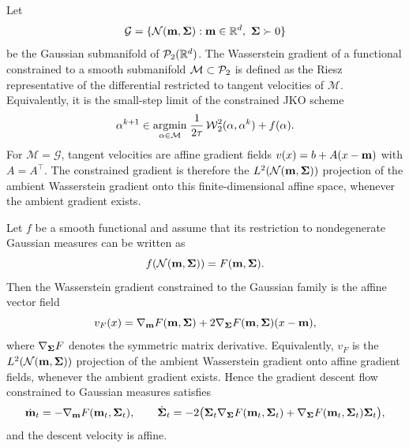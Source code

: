 Let
\[
	\mathcal G=\{\mathcal{N}(\mathbf{m},\mathbf{\Sigma}):\mathbf{m}\in\mathbb{R}^d,\ \mathbf{\Sigma}\succ0\}
\]
be the Gaussian submanifold of $\mathcal{P}_2(\mathbb{R}^d)$. The Wasserstein gradient of a functional constrained to a smooth submanifold $\mathcal M\subset\mathcal{P}_2$ is defined as the Riesz representative of the differential restricted to tangent velocities of $\mathcal M$. Equivalently, it is the small-step limit of the constrained JKO scheme
\[
	\alpha^{k+1}\in
	\underset{\alpha\in\mathcal M}{\operatorname{argmin}}\;
	\frac{1}{2\tau}\operatorname{\mathcal{W}}_2^2(\alpha,\alpha^k)+f(\alpha).
\]
For $\mathcal M=\mathcal G$, tangent velocities are affine gradient fields $v(x)=b+A(x-\mathbf{m})$ with $A=A^\top$. The constrained gradient is therefore the $L^2(\mathcal{N}(\mathbf{m},\mathbf{\Sigma}))$ projection of the ambient Wasserstein gradient onto this finite-dimensional affine space, whenever the ambient gradient exists.

\begin{prop}\label{prop-gaussian-gradient-bullet-list}
	Let $f$ be a smooth functional and assume that its restriction to nondegenerate Gaussian measures can be written as
	\[
		f(\mathcal{N}(\mathbf{m},\mathbf{\Sigma}))=F(\mathbf{m},\mathbf{\Sigma}).
	\]
	Then the Wasserstein gradient constrained to the Gaussian family is the affine vector field
	\[
		v_F(x)
		=
		\nabla_{\mathbf{m}} F(\mathbf{m},\mathbf{\Sigma})
		+
		2\nabla_{\mathbf{\Sigma}} F(\mathbf{m},\mathbf{\Sigma})(x-\mathbf{m}),
	\]
	where $\nabla_{\mathbf{\Sigma}} F$ denotes the symmetric matrix derivative. Equivalently, $v_F$ is the $L^2(\mathcal{N}(\mathbf{m},\mathbf{\Sigma}))$ projection of the ambient Wasserstein gradient onto affine gradient fields, whenever the ambient gradient exists. Hence the gradient descent flow constrained to Gaussian measures satisfies
	\begin{equation}\label{eq-gaussian-wgf-closure}
		\dot{\mathbf{m}}_t=-\nabla_{\mathbf{m}} F(\mathbf{m}_t,\mathbf{\Sigma}_t),
		\qquad
		\dot{\mathbf{\Sigma}}_t=-2\bigl(\mathbf{\Sigma}_t\nabla_{\mathbf{\Sigma}} F(\mathbf{m}_t,\mathbf{\Sigma}_t)+\nabla_{\mathbf{\Sigma}} F(\mathbf{m}_t,\mathbf{\Sigma}_t)\mathbf{\Sigma}_t\bigr),
	\end{equation}
	and the descent velocity is affine.
\end{prop}

